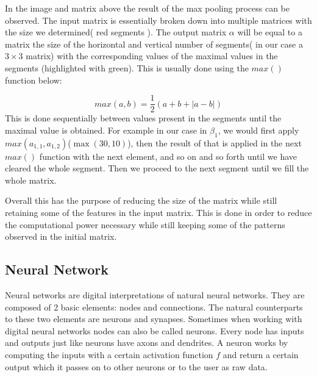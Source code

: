 \documentclass[9pt,onecolumn,oneside]{osajnl}
\begin{document}
	In the image and matrix above the result of the max pooling process can be observed. The input matrix is essentially broken down into multiple matrices with the size we determined( red segments ). The output matrix \(\alpha\) will be equal to a matrix the size of the horizontal and vertical number of segments( in our case a \(3 \times 3\) matrix) with the corresponding values of the maximal values in the segments (highlighted with green). This is usually done using the \(max()\) function below:
    
    \[max(a,b)=\frac{1}{2}(a+b+|a-b|)\]
  This is done sequentially between values present in the segments until the maximal value is obtained. 
For example in our case in \(\beta_{1}\), we would first apply \(max(a_{1,1},a_{1,2})\)(\(\max(30,10)\)), then the result of that is applied in the next \(max()\) function with the next element, and so on and so forth until we have cleared the whole segment. Then we proceed to the next segment until we fill the whole matrix.

	Overall this has the purpose of reducing the size of the matrix while still retaining some of the features in the input matrix. This is done in order to reduce the computational power necessary while still keeping some of the patterns observed in the initial matrix.
    
    
\pagebreak
\subsection{Neural Network}

	Neural networks are digital interpretations of natural neural networks. They are composed of 2 basic elements: nodes and connections. The natural counterparts to these two elements are neurons and synapses. Sometimes when working with digital neural networks nodes can also be called neurons. Every node has inputs and outputs just like neurons have axons and dendrites. A neuron works by computing the inputs with a certain activation function \(f\) and return a certain output which it passes on to other neurons or to the user as raw data. 
    
\end{document}
